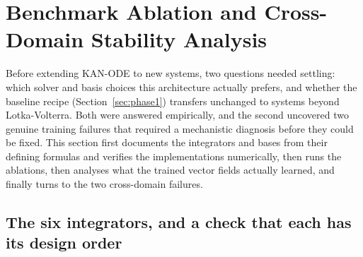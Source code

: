 \section{Benchmark Ablation and Cross-Domain Stability Analysis}
\label{sec:phase2}

Before extending KAN-ODE to new systems, two questions needed settling: which
solver and basis choices this architecture actually prefers, and whether the
baseline recipe (Section~\ref{sec:phase1}) transfers unchanged to systems
beyond Lotka-Volterra. Both were answered empirically, and the second
uncovered two genuine training failures that required a mechanistic diagnosis
before they could be fixed. This section first documents the integrators and
bases from their defining formulas and verifies the implementations
numerically, then runs the ablations, then analyses what the trained vector
fields actually learned, and finally turns to the two cross-domain failures.

\subsection{The six integrators, and a check that each has its design order}
\label{sec:integrators}

